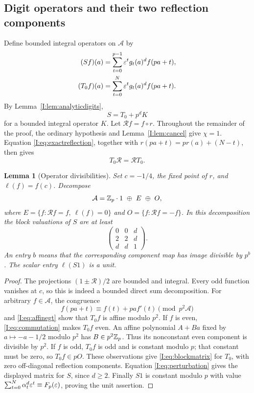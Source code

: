 \documentclass[11pt,letterpaper]{article}
\newtheorem{lemma}[theorem]{Lemma}
\theoremstyle{definition}
\theoremstyle{remark}
\begin{document}
\subsection{Digit operators and their two reflection components}

Define bounded integral operators on $\mathcal A$ by
\begin{align}
 (Sf)(a)&=\sum_{t=0}^{p-1}\varepsilon^t g_t(a)^d f(pa+t),
                                                      \label{I:eq:fulloperator}\\
 (T_0f)(a)&=\sum_{t=0}^{N}\varepsilon^t g_t(a)^d f(pa+t).
                                                      \label{I:eq:loweroperator}
\end{align}
By Lemma~\ref{I:lem:analyticdigits},
\begin{equation}\label{I:eq:perturbation}
 S=T_0+p^dK
\end{equation}
for a bounded integral operator $K$.
Let $\mathcal Rf=f\circ r$.  Throughout the remainder of the proof,
the ordinary hypothesis and Lemma~\ref{I:lem:cancel} give $\chi=1$.
Equation \eqref{I:eq:exactreflection}, together with
$r(pa+t)=pr(a)+(N-t)$, then gives
\begin{equation}\label{I:eq:commutation}
 T_0\mathcal R=\mathcal RT_0.
\end{equation}

\begin{lemma}[Operator divisibilities]\label{I:lem:operatorblocks}
Set $c=-1/4$, the fixed point of $r$, and $\ell(f)=f(c)$.
Decompose
\[
 \mathcal A=\Zp\cdot1\ \oplus\ E\ \oplus\ O,
\]
where $E=\{f:\mathcal Rf=f,\ \ell(f)=0\}$ and
$O=\{f:\mathcal Rf=-f\}$.
In this decomposition the block valuations of $S$ are at least
\begin{equation}\label{I:eq:blockmatrix}
 \begin{pmatrix}
 0&0&d\\
 2&2&d\\
 d&d&1
 \end{pmatrix}.
\end{equation}
An entry $b$ means that the corresponding component map has image
divisible by $p^b$.  The scalar entry $\ell(S1)$ is a unit.
\end{lemma}
\begin{proof}
The projections $(1\pm\mathcal R)/2$ are bounded and integral.
Every odd function vanishes at $c$, so this is indeed a bounded direct
sum decomposition.
For arbitrary $f\in\mathcal A$, the congruence
\[
 f(pa+t)\equiv f(t)+pa f'(t)\pmod{p^2\mathcal A}
\]
and \eqref{I:eq:affinegt} show that $T_0f$ is affine modulo $p^2$.
If $f$ is even, \eqref{I:eq:commutation} makes $T_0f$ even.  An affine
polynomial $A+Ba$ fixed by $a\mapsto-a-1/2$ modulo $p^2$ has
$B\in p^2\mathbb Z_p$.  Thus its nonconstant even component is divisible by
$p^2$.  If $f$ is odd, $T_0f$ is odd and is constant modulo $p$;
that constant must be zero, so $T_0f\in pO$.
These observations give \eqref{I:eq:blockmatrix} for $T_0$, with zero
off-diagonal reflection components.  Equation \eqref{I:eq:perturbation}
gives the displayed matrix for $S$, since $d\ge2$.
Finally $S1$ is constant modulo $p$ with value
$\sum_{t=0}^N\alpha_t^d\varepsilon^t\equiv F_p(\varepsilon)$, proving the unit assertion.
\end{proof}
\end{document}
